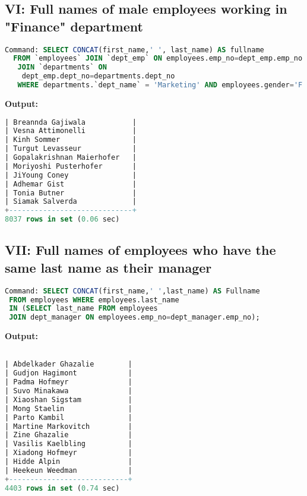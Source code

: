 \documentclass[12pt]{report}
\begin{document}
\subsection*{VI: Full names of male employees working in "Finance" department}

\begin{lstlisting}[language=sql]
Command: SELECT CONCAT(first_name,' ', last_name) AS fullname
  FROM `employees` JOIN `dept_emp` ON employees.emp_no=dept_emp.emp_no
   JOIN `departments` ON
    dept_emp.dept_no=departments.dept_no 
   WHERE departments.`dept_name` = 'Marketing' AND employees.gender='F';
\end{lstlisting}
\textbf{Output:}
\begin{lstlisting}[language=sql]
| Breannda Gajiwala           |
| Vesna Attimonelli           |
| Kinh Sommer                 |
| Turgut Levasseur            |
| Gopalakrishnan Maierhofer   |
| Moriyoshi Pusterhofer       |
| JiYoung Coney               |
| Adhemar Gist                |
| Tonia Butner                |
| Siamak Salverda             |
+-----------------------------+
8037 rows in set (0.06 sec)

\end{lstlisting}

\subsection*{VII: Full names of employees who have the same last name as
their manager}

\begin{lstlisting}[language=sql]
Command: SELECT CONCAT(first_name,' ',last_name) AS Fullname
 FROM employees WHERE employees.last_name 
 IN (SELECT last_name FROM employees  
 JOIN dept_manager ON employees.emp_no=dept_manager.emp_no);

\end{lstlisting}
\textbf{Output:}
\begin{lstlisting}[language=sql]

| Abdelkader Ghazalie        |
| Gudjon Hagimont            |
| Padma Hofmeyr              |
| Suvo Minakawa              |
| Xiaoshan Sigstam           |
| Mong Staelin               |
| Parto Kambil               |
| Martine Markovitch         |
| Zine Ghazalie              |
| Vasilis Kaelbling          |
| Xiadong Hofmeyr            |
| Hidde Alpin                |
| Heekeun Weedman            |
+----------------------------+
4403 rows in set (0.74 sec)

\end{lstlisting}
\end{document}

